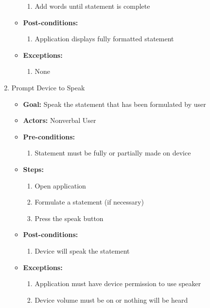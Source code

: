 \begin{enumerate}
\begin{itemize}
\begin{enumerate}
			\item Add words until statement is complete
		\end{enumerate}
		\item \textbf{Post-conditions:}
		\begin{enumerate}
			\item Application displays fully formatted statement
		\end{enumerate}
		\item \textbf{Exceptions:}
		\begin{enumerate}
			\item None
		\end{enumerate}
	\end{itemize}
	\item Prompt Device to Speak
	\begin{itemize}
   		\item \textbf{Goal:} Speak the statement that has been formulated by user
		\item \textbf{Actors:} Nonverbal User
		\item \textbf{Pre-conditions:}
		\begin{enumerate}
			\item Statement must be fully or partially made on device
		\end{enumerate}
		\item \textbf{Steps:}
		\begin{enumerate}
			\item Open application
			\item Formulate a statement (if necessary)
			\item Press the speak button
		\end{enumerate}
		\item \textbf{Post-conditions:}
		\begin{enumerate}
			\item Device will speak the statement
		\end{enumerate}
		\item \textbf{Exceptions:}
		\begin{enumerate}
			\item Application must have device permission to use speaker
			\item Device volume must be on or nothing will be heard
		\end{enumerate}
	\end{itemize}
\end{enumerate}